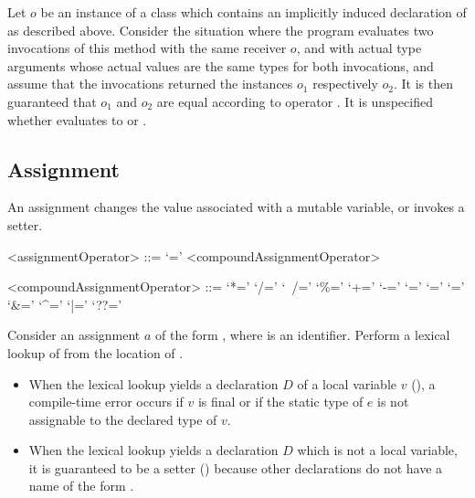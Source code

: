 \documentclass[makeidx]{article}
\begin{document}
{{\LMHash{}%
Let $o$ be an instance of a class which contains
an implicitly induced declaration of \gmiName{}
as described above.
%
Consider the situation where the program evaluates
two invocations of this method with the same receiver $o$,
and with actual type arguments whose actual values are
the same types  for both invocations,
and assume that the invocations returned
the instances $o_1$ respectively $o_2$.
%
It is then guaranteed that $o_1$ and $o_2$ are equal
according to operator \lit{==}.
It is unspecified whether
evaluates to \TRUE{} or \FALSE.

} %



\subsection{Assignment}

\LMHash{}%
An assignment changes the value associated with a mutable variable,
or invokes a setter.

\begin{grammar}
<assignmentOperator> ::= `='
  \alt <compoundAssignmentOperator>

<compoundAssignmentOperator> ::= `*='
  \alt `/='
  \alt `~/='
  \alt `\%='
  \alt `+='
  \alt `-='
  \alt `\ltlt='
  \alt `\gtgtgt='
  \alt `\gtgt='
  \alt `\&='
  \alt `^='
  \alt `|='
  \alt `??='
\end{grammar}

\LMHash{}%
Consider an assignment $a$ of the form ,
where \id{} is an identifier.
Perform a lexical lookup of \code{\id=} from the location of \id.

\begin{itemize}
\item
  When the lexical lookup yields a declaration $D$ of a local variable $v$
  (),
  a compile-time error occurs if $v$ is final
  or if the static type of $e$ is not assignable to the declared type of $v$.
\item
  When the lexical lookup yields a declaration $D$
  which is not a local variable,
  it is guaranteed to be a setter
  ()
  because other declarations do not have a name
  of the form \code{\id=}.


\end{itemize}}
\end{document}
